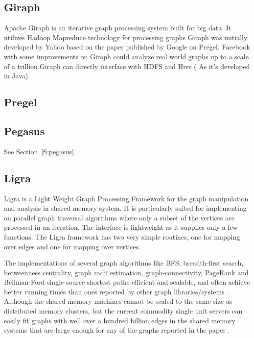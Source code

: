 \subsection{Giraph \cv}

     Apache Giraph is an iterative graph processing system built for big
     data \cite{www-giraph-apache}.It utilizes Hadoop Mapreduce
     technology for processing graphs \cite{www-apache-giraph-wiki}
     Giraph was initially developed by Yahoo based on the paper
     published by Google on Pregel. \cite{www-apache-giraph-pcworld}
     Facebook with some improvements on Giraph could analyze real world
     graphs up to a scale of a trillion.Giraph can directly interface
     with HDFS and Hive ( As it's developed in
     Java). \cite{www-apache-giraph-fb}
   
\subsection{Pregel}
\subsection{Pegasus}

     See Section~\ref{S:pegasus}.

\subsection{Ligra}

     Ligra is a Light Weight Graph Processing Framework for the graph
     manipulation and analysis in shared memory system. It is
     particularly suited for implementing on parallel graph traversal
     algorithms where only a subset of the vertices are processed in an
     iteration. The interface is lightweight as it supplies only a
     few functions. The Ligra framework has two very simple routines,
     one for mapping over edges and one for mapping over vertices.

     The implementations of several graph algorithms like BFS,
     breadth-first search, betweenness centrality, graph radii
     estimation, graph-connectivity, PageRank and Bellman-Ford
     single-source shortest paths efficient and scalable, and often
     achieve better running times than ones reported by other graph
     libraries/systems \cite{ligra-paper-2013}.  Although the shared
     memory machines cannot be scaled to the same size as distributed
     memory clusters, but the current commodity single unit servers
     can easily fit graphs with well over a hundred billion edges in
     the shared memory systems that are large enough for any of the
     graphs reported in the paper \cite{ligra-paper-2}.

